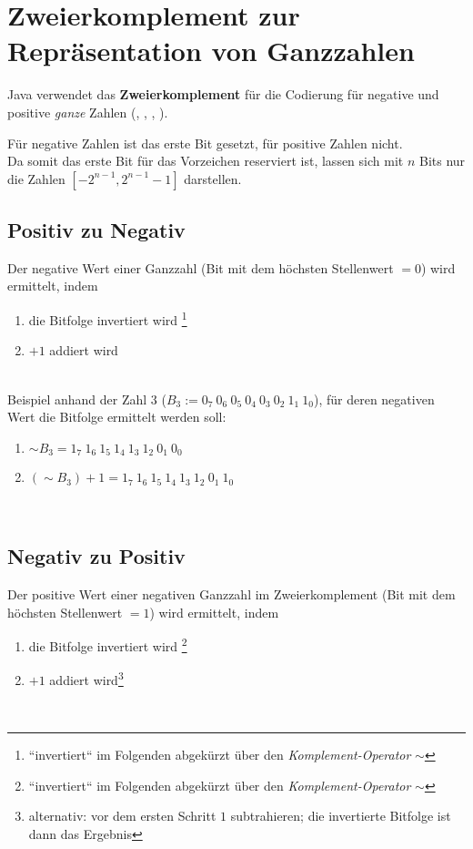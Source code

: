 \section{Zweierkomplement zur Repräsentation von Ganzzahlen}


Java verwendet das \textbf{Zweierkomplement} für die Codierung für negative und positive \textit{ganze} Zahlen (, , , ).

\noindent
Für negative Zahlen ist das erste Bit gesetzt, für positive Zahlen nicht.\\
Da somit das erste Bit für das Vorzeichen reserviert ist, lassen sich mit $n$ Bits nur die Zahlen $[-2^{n-1}, 2^{n-1} -1]$ darstellen.\\

\subsection*{Positiv zu Negativ}
Der negative Wert einer Ganzzahl (Bit mit dem höchsten Stellenwert $=0$) wird ermittelt, indem

\begin{enumerate}
    \item die Bitfolge invertiert wird \footnote{``invertiert`` im Folgenden abgekürzt über den \textit{Komplement-Operator} $\sim$}
    \item $+1$ addiert wird
\end{enumerate}\\

\noindent
Beispiel anhand der Zahl $3$ ($B_{3}:= 0_7\ 0_6\ 0_5\ 0_4\ 0_3\ 0_2\ 1_1\ 1_0$), für deren negativen Wert die Bitfolge ermittelt werden soll:

\begin{enumerate}
    \item $\sim B_{3} = 1_7\ 1_6\ 1_5\ 1_4\ 1_3\ 1_2\ 0_1\ 0_0$
    \item $(\sim B_{3}) + 1 = 1_7\ 1_6\ 1_5\ 1_4\ 1_3\ 1_2\ 0_1\ 1_0$
\end{enumerate}\\


\subsection*{Negativ zu Positiv}
Der positive Wert einer negativen Ganzzahl im Zweierkomplement (Bit mit dem höchsten Stellenwert $=1$) wird ermittelt, indem

\begin{enumerate}
    \item die Bitfolge invertiert wird \footnote{``invertiert`` im Folgenden abgekürzt über den \textit{Komplement-Operator} $\sim$}
    \item $+1$ addiert wird\footnote{alternativ: vor dem ersten Schritt $1$ subtrahieren; die invertierte Bitfolge ist dann das Ergebnis}
\end{enumerate}\\

